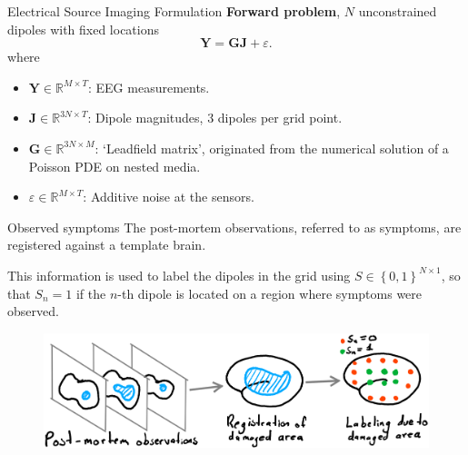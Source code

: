 \documentclass[progressbar=head]{beamer}
\newcommand{\set}[1]{ \left\{ #1 \right\} }
\newcommand{\J}{\mathbf{J}}
\newcommand{\Y}{\mathbf{Y}}
\newcommand{\G}{\mathbf{G}}
\newcommand{\R}{\mathbb{R}}
\begin{document}
\begin{frame}{Electrical Source Imaging Formulation}
\textbf{Forward problem}, $N$ unconstrained dipoles with fixed locations
\begin{equation}
\Y = \G \J + \varepsilon.
\end{equation}
where
\begin{itemize}
\item $\Y \in \R^{M \times T}$: EEG measurements.
\item $\J \in \R^{3N \times T}$: Dipole magnitudes, 3 dipoles per grid point.
\item $\G \in \R^{3N\times M}$: `Leadfield matrix', originated from the numerical solution of a Poisson PDE on nested media.
\item $\varepsilon\in \R^{M\times T}$: Additive noise at the sensors.
\end{itemize}
\end{frame}

\begin{frame}{Observed symptoms}
The post-mortem observations, referred to as \alert{symptoms}, are registered against a template brain. 

This information is used to label the dipoles in the grid using
${S\in \set{0,1}^{N\times 1}}$, so that $S_n = 1$ if the $n$-th dipole is located on a region where symptoms were observed.

\begin{figure}
\centering
\includegraphics[width=0.8\linewidth]{./img_oldbeamer/sketch02_v2}
\end{figure}

\end{frame}
\end{document}
